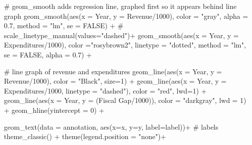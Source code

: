 \documentclass[
  letterpaper,
  DIV=11,
  numbers=noendperiod]{scrreport}
\newenvironment{Shaded}{\begin{snugshade}}{\end{snugshade}}
\newcommand{\AttributeTok}[1]{\textcolor[rgb]{0.40,0.45,0.13}{#1}}
\newcommand{\CommentTok}[1]{\textcolor[rgb]{0.37,0.37,0.37}{#1}}
\newcommand{\ConstantTok}[1]{\textcolor[rgb]{0.56,0.35,0.01}{#1}}
\newcommand{\DecValTok}[1]{\textcolor[rgb]{0.68,0.00,0.00}{#1}}
\newcommand{\FloatTok}[1]{\textcolor[rgb]{0.68,0.00,0.00}{#1}}
\newcommand{\FunctionTok}[1]{\textcolor[rgb]{0.28,0.35,0.67}{#1}}
\newcommand{\NormalTok}[1]{\textcolor[rgb]{0.00,0.23,0.31}{#1}}
\newcommand{\SpecialCharTok}[1]{\textcolor[rgb]{0.37,0.37,0.37}{#1}}
\newcommand{\StringTok}[1]{\textcolor[rgb]{0.13,0.47,0.30}{#1}}
\begin{document}
\begin{Shaded}
\begin{Highlighting}[]
  \CommentTok{\# geom\_smooth adds regression line, graphed first so it appears behind line graph}
  \FunctionTok{geom\_smooth}\NormalTok{(}\FunctionTok{aes}\NormalTok{(}\AttributeTok{x =}\NormalTok{ Year, }\AttributeTok{y =}\NormalTok{ Revenue}\SpecialCharTok{/}\DecValTok{1000}\NormalTok{), }\AttributeTok{color =} \StringTok{"gray"}\NormalTok{, }\AttributeTok{alpha =} \FloatTok{0.7}\NormalTok{, }\AttributeTok{method =} \StringTok{"lm"}\NormalTok{, }\AttributeTok{se =} \ConstantTok{FALSE}\NormalTok{) }\SpecialCharTok{+} 
  \CommentTok{\#  scale\_linetype\_manual(values="dashed")+}
  \FunctionTok{geom\_smooth}\NormalTok{(}\FunctionTok{aes}\NormalTok{(}\AttributeTok{x =}\NormalTok{ Year, }\AttributeTok{y =}\NormalTok{ Expenditures}\SpecialCharTok{/}\DecValTok{1000}\NormalTok{), }\AttributeTok{color =}\StringTok{"rosybrown2"}\NormalTok{, }\AttributeTok{linetype =} \StringTok{"dotted"}\NormalTok{, }\AttributeTok{method =} \StringTok{"lm"}\NormalTok{, }\AttributeTok{se =} \ConstantTok{FALSE}\NormalTok{, }\AttributeTok{alpha =} \FloatTok{0.7}\NormalTok{) }\SpecialCharTok{+}

  \CommentTok{\# line graph of revenue and expenditures}
  \FunctionTok{geom\_line}\NormalTok{(}\FunctionTok{aes}\NormalTok{(}\AttributeTok{x =}\NormalTok{ Year, }\AttributeTok{y =}\NormalTok{ Revenue}\SpecialCharTok{/}\DecValTok{1000}\NormalTok{), }\AttributeTok{color =} \StringTok{"Black"}\NormalTok{, }\AttributeTok{size=}\DecValTok{1}\NormalTok{) }\SpecialCharTok{+}
  \FunctionTok{geom\_line}\NormalTok{(}\FunctionTok{aes}\NormalTok{(}\AttributeTok{x =}\NormalTok{ Year, }\AttributeTok{y =}\NormalTok{ Expenditures}\SpecialCharTok{/}\DecValTok{1000}\NormalTok{, }\AttributeTok{linetype =} \StringTok{"dashed"}\NormalTok{), }\AttributeTok{color =} \StringTok{"red"}\NormalTok{, }\AttributeTok{lwd=}\DecValTok{1}\NormalTok{) }\SpecialCharTok{+}
  \FunctionTok{geom\_line}\NormalTok{(}\FunctionTok{aes}\NormalTok{(}\AttributeTok{x =}\NormalTok{ Year, }\AttributeTok{y =}\NormalTok{ (}\StringTok{\textasciigrave{}}\AttributeTok{Fiscal Gap}\StringTok{\textasciigrave{}}\SpecialCharTok{/}\DecValTok{1000}\NormalTok{)), }\AttributeTok{color =} \StringTok{"darkgray"}\NormalTok{, }\AttributeTok{lwd =} \DecValTok{1}\NormalTok{) }\SpecialCharTok{+}
    \FunctionTok{geom\_hline}\NormalTok{(}\AttributeTok{yintercept =} \DecValTok{0}\NormalTok{) }\SpecialCharTok{+}

  \FunctionTok{geom\_text}\NormalTok{(}\AttributeTok{data =}\NormalTok{ annotation, }\FunctionTok{aes}\NormalTok{(}\AttributeTok{x=}\NormalTok{x, }\AttributeTok{y=}\NormalTok{y, }\AttributeTok{label=}\NormalTok{label))}\SpecialCharTok{+}
  \CommentTok{\# labels}
    \FunctionTok{theme\_classic}\NormalTok{() }\SpecialCharTok{+}
    \FunctionTok{theme}\NormalTok{(}\AttributeTok{legend.position =} \StringTok{"none"}\NormalTok{)}\SpecialCharTok{+}


\end{Highlighting}
\end{Shaded}
\end{document}
